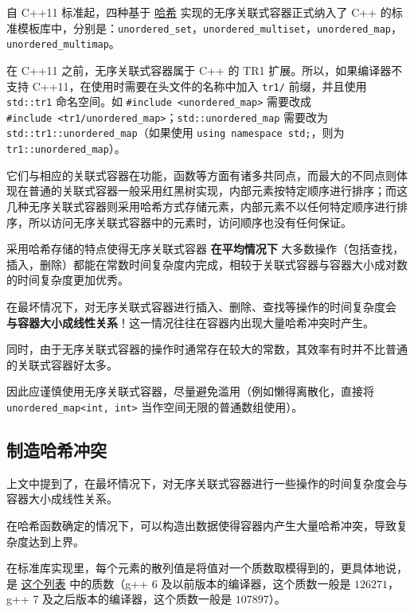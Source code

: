 自 C++11 标准起，四种基于 \href{../../ds/hash.md}{哈希} 实现的无序关联式容器正式纳入了 C++ 的标准模板库中，分别是：\texttt{unordered\_set}，\texttt{unordered\_multiset}，\texttt{unordered\_map}，\texttt{unordered\_multimap}。

在 C++11 之前，无序关联式容器属于 C++ 的 TR1 扩展。所以，如果编译器不支持 C++11，在使用时需要在头文件的名称中加入 \texttt{tr1/} 前缀，并且使用 \texttt{std::tr1} 命名空间。如 \texttt{\#include\ \textless{}unordered\_map\textgreater{}} 需要改成 \texttt{\#include\ \textless{}tr1/unordered\_map\textgreater{}}；\texttt{std::unordered\_map} 需要改为 \texttt{std::tr1::unordered\_map}（如果使用 \texttt{using\ namespace\ std;}，则为 \texttt{tr1::unordered\_map}）。

它们与相应的关联式容器在功能，函数等方面有诸多共同点，而最大的不同点则体现在普通的关联式容器一般采用红黑树实现，内部元素按特定顺序进行排序；而这几种无序关联式容器则采用哈希方式存储元素，内部元素不以任何特定顺序进行排序，所以访问无序关联式容器中的元素时，访问顺序也没有任何保证。

采用哈希存储的特点使得无序关联式容器 \textbf{在平均情况下} 大多数操作（包括查找，插入，删除）都能在常数时间复杂度内完成，相较于关联式容器与容器大小成对数的时间复杂度更加优秀。

在最坏情况下，对无序关联式容器进行插入、删除、查找等操作的时间复杂度会 \textbf{与容器大小成线性关系}！这一情况往往在容器内出现大量哈希冲突时产生。

同时，由于无序关联式容器的操作时通常存在较大的常数，其效率有时并不比普通的关联式容器好太多。

因此应谨慎使用无序关联式容器，尽量避免滥用（例如懒得离散化，直接将 \texttt{unordered\_map\textless{}int,\ int\textgreater{}} 当作空间无限的普通数组使用）。

\subsection{制造哈希冲突}\label{ux5236ux9020ux54c8ux5e0cux51b2ux7a81}

上文中提到了，在最坏情况下，对无序关联式容器进行一些操作的时间复杂度会与容器大小成线性关系。

在哈希函数确定的情况下，可以构造出数据使得容器内产生大量哈希冲突，导致复杂度达到上界。

在标准库实现里，每个元素的散列值是将值对一个质数取模得到的，更具体地说，是 \href{https://github.com/gcc-mirror/gcc/blob/releases/gcc-8.1.0/libstdc\%2B\%2B-v3/src/shared/hashtable-aux.cc}{这个列表} 中的质数（g++ 6 及以前版本的编译器，这个质数一般是 \(126271\)，g++ 7 及之后版本的编译器，这个质数一般是 \(107897\)）。

